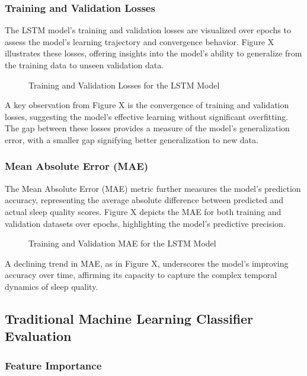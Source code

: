 \documentclass[10pt]{extarticle}
\begin{document}
\subsubsection{Training and Validation Losses}

The LSTM model's training and validation losses are visualized over epochs to assess the model's learning trajectory and convergence behavior. Figure X illustrates these losses, offering insights into the model's ability to generalize from the training data to unseen validation data.

\begin{figure}[H]
    \centering
    \caption{Training and Validation Losses for the LSTM Model}
\end{figure}

A key observation from Figure X is the convergence of training and validation losses, suggesting the model's effective learning without significant overfitting. The gap between these losses provides a measure of the model's generalization error, with a smaller gap signifying better generalization to new data.

\subsubsection{Mean Absolute Error (MAE)}

The Mean Absolute Error (MAE) metric further measures the model's prediction accuracy, representing the average absolute difference between predicted and actual sleep quality scores. Figure X depicts the MAE for both training and validation datasets over epochs, highlighting the model's predictive precision.

\begin{figure}[H]
    \centering
    \caption{Training and Validation MAE for the LSTM Model}
\end{figure}

A declining trend in MAE, as in Figure X, underscores the model's improving accuracy over time, affirming its capacity to capture the complex temporal dynamics of sleep quality.

\subsection{Traditional Machine Learning Classifier Evaluation}

\subsubsection{Feature Importance}
\end{document}
